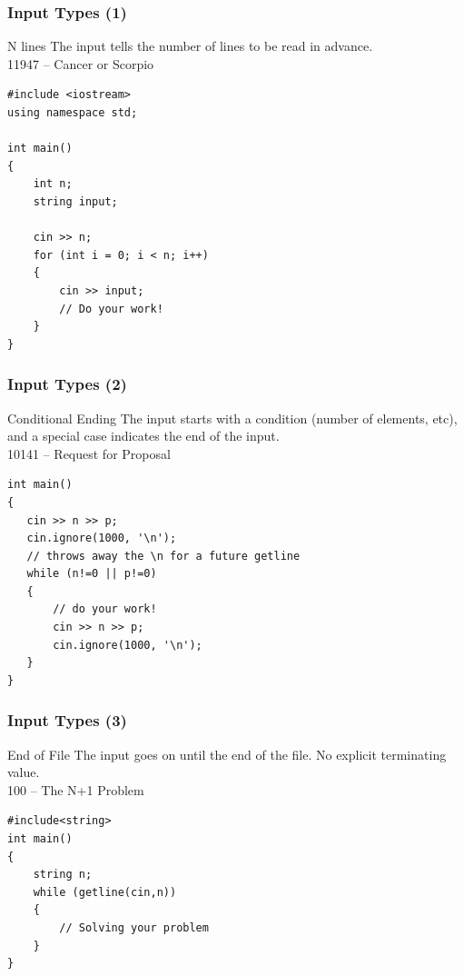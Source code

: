 \documentclass{beamer}
\begin{document}
\begin{frame}
  \frametitle{Input Types (1)}
  \begin{block}{N lines}
    The input tells the number of lines to be read in advance.\\
     11947 -- Cancer or Scorpio
  \end{block}

{\smaller 
\begin{verbatim}
#include <iostream>
using namespace std;

int main()
{
    int n;
    string input;
    
    cin >> n;
    for (int i = 0; i < n; i++)
    {
        cin >> input;
        // Do your work!
    }    
}
\end{verbatim}}

\end{frame}

\begin{frame}
  \frametitle{Input Types (2)}
  \begin{block}{Conditional Ending}
    The input starts with a condition (number of elements, etc), and 
    a special case indicates the end of the input.\\
     10141 -- Request for Proposal
  \end{block}

{\smaller
\begin{verbatim}
int main()
{
   cin >> n >> p;
   cin.ignore(1000, '\n'); 
   // throws away the \n for a future getline
   while (n!=0 || p!=0)
   {
       // do your work!
       cin >> n >> p;               
       cin.ignore(1000, '\n');
   }
}
\end{verbatim}}
\end{frame}

\begin{frame}
  \frametitle{Input Types (3)}
  \begin{block}{End of File}
    The input goes on until the end of the file. No explicit
    terminating value.\\
     100 -- The N+1 Problem
  \end{block}
{\smaller
\begin{verbatim}
#include<string>
int main()
{
    string n;
    while (getline(cin,n))
    {
        // Solving your problem
    }
}
\end{verbatim}
}
\end{frame}
\end{document}
